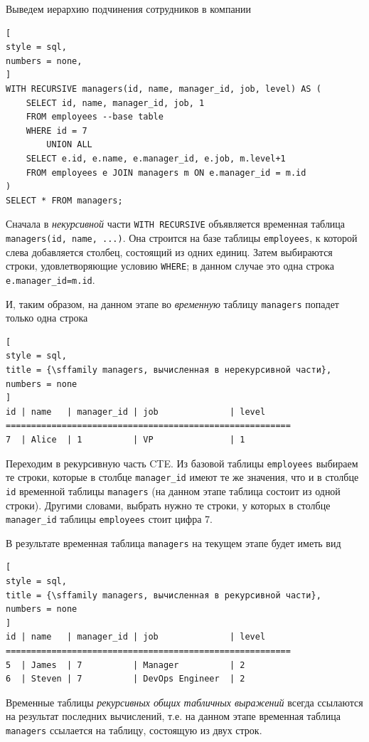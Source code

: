 \documentclass[%
	11pt,
	a4paper,
	utf8,
		]{article}
\begin{document}
Выведем иерархию подчинения сотрудников в компании

\begin{lstlisting}[
style = sql,
numbers = none,
]
WITH RECURSIVE managers(id, name, manager_id, job, level) AS (
    SELECT id, name, manager_id, job, 1
    FROM employees --base table
    WHERE id = 7
        UNION ALL
    SELECT e.id, e.name, e.manager_id, e.job, m.level+1
    FROM employees e JOIN managers m ON e.manager_id = m.id
)
SELECT * FROM managers;
\end{lstlisting}

Сначала в \emph{некурсивной} части \texttt{WITH RECURSIVE} объявляется временная таблица \texttt{managers(id, name, ...)}. Она строится на базе таблицы \texttt{employees}, к которой слева добавляется столбец, состоящий из одних единиц. Затем выбираются строки, удовлетворяющие условию \texttt{WHERE}; в данном случае это одна строка \texttt{e.manager\_id=m.id}.

И, таким образом, на данном этапе во \emph{временную} таблицу \texttt{managers} попадет только одна строка
\begin{lstlisting}[
style = sql,
title = {\sffamily managers, вычисленная в нерекурсивной части},
numbers = none
]
id | name   | manager_id | job              | level
========================================================
7  | Alice  | 1          | VP               | 1
\end{lstlisting}

Переходим в рекурсивную часть CTE. Из базовой таблицы \texttt{employees} выбираем те строки, которые в столбце \texttt{manager\_id} имеют те же значения, что и в столбце \texttt{id} временной таблицы \texttt{managers} (на данном этапе таблица состоит из одной строки). Другими словами, выбрать нужно те строки, у которых в столбце \texttt{manager\_id} таблицы \texttt{employees} стоит цифра 7.

В результате временная таблица \texttt{managers} на текущем этапе будет иметь вид

\begin{lstlisting}[
style = sql,
title = {\sffamily managers, вычисленная в рекурсивной части},
numbers = none
]
id | name   | manager_id | job              | level
========================================================
5  | James  | 7          | Manager          | 2
6  | Steven | 7          | DevOps Engineer  | 2
\end{lstlisting}

Временные таблицы \emph{рекурсивных общих табличных выражений} всегда ссылаются на результат последних вычислений, т.е. на данном этапе временная таблица \texttt{managers} ссылается на таблицу, состоящую из двух строк.
\end{document}
